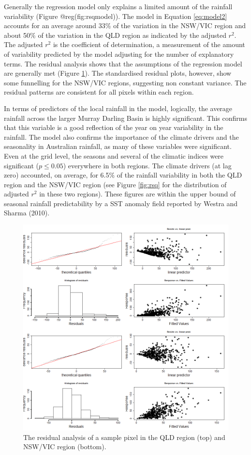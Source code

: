 \documentclass[fleqn,10pt,lineno]{wlpeerj} %
\begin{document}
Generally the regression model only explains a limited amount of the
rainfall variability (Figure @reg(fig:rsqmodel)). The model in Equation
\eqref{eq:model2} accounts for an average around 33\% of the variation in
the NSW/VIC region and about 50\% of the variation in the QLD region as
indicated by the adjusted \(r^2\). The adjusted \(r^2\) is the
coefficient of determination, a measurement of the amount of variability
predicted by the model adjusting for the number of explanatory terms.
The residual analysis shows that the assumptions of the regression model
are generally met (Figure \ref{fig:residuals}). The standardised
residual plots, however, show some funnelling for the NSW/VIC regions,
suggesting non constant variance. The residual patterns are consistent
for all pixels within each region.

In terms of predictors of the local rainfall in the model, logically,
the average rainfall across the larger Murray Darling Basin is highly
significant. This confirms that this variable is a good reflection of
the year on year variability in the rainfall. The model also confirms
the importance of the climate drivers and the seasonality in Australian
rainfall, as many of these variables were significant. Even at the grid
level, the seasons and several of the climatic indices were significant
(\(p \leq 0.05\)) everywhere in both regions. The climate drivers (at
lag zero) accounted, on average, for 6.5\% of the rainfall variability
in both the QLD region and the NSW/VIC region (see Figure \ref{fig:rsq}
for the distribution of adjusted \(r^2\) in these two regions). These
figures are within the upper bound of seasonal rainfall predictability
by a SST anomaly field reported by Westra and Sharma (2010).

\begin{figure}
\includegraphics[width=0.9\linewidth]{figures/gam_check} \caption{The residual analysis of a sample pixel in the QLD region (top) and NSW/VIC region (bottom).}\label{fig:residuals}
\end{figure}
\end{document}
